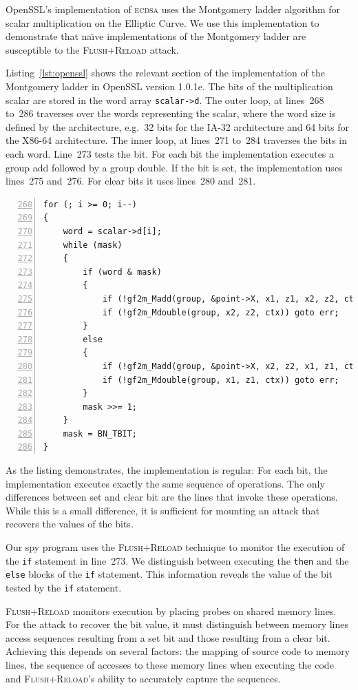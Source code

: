 \documentclass[twocolumn]{svjour3}
\begin{document}
OpenSSL's implementation of \textsc{ecdsa} uses the Montgomery ladder algorithm for scalar multiplication
on the Elliptic Curve.
We use this implementation to demonstrate that na{\"\i}ve implementations of the Montgomery ladder are
susceptible to the \textsc{Flush+Reload} attack.

Listing~\ref{lst:openssl} shows the relevant section of the implementation of the Montgomery ladder in OpenSSL version 1.0.1e.
The bits of the multiplication scalar are stored in the word array \texttt{scalar->d}.
The outer loop, at lines~268 to~286 traverses over the words representing the scalar,
where the word size is defined by the architecture, e.g.\ 32 bits for the IA-32 architecture and 64 bits for the X86-64 architecture.
The inner loop, at lines~271 to~284 traverses the bits in each word.
Line~273 tests the bit. 
For each bit the implementation executes a group add followed by a group double.
If the bit is set, the implementation uses lines~275 and~276.
For clear bits it uses lines~280 and~281.

\begin{lstlisting}[numbers=left,firstnumber=268,float=htb,caption=OpenSSL implementation of the Montgomery ladder,label=lst:openssl]
for (; i >= 0; i--)
{
    word = scalar->d[i];
    while (mask)
    {
        if (word & mask)
        {
            if (!gf2m_Madd(group, &point->X, x1, z1, x2, z2, ctx)) goto err;
            if (!gf2m_Mdouble(group, x2, z2, ctx)) goto err;
        }
        else
        {
            if (!gf2m_Madd(group, &point->X, x2, z2, x1, z1, ctx)) goto err;
            if (!gf2m_Mdouble(group, x1, z1, ctx)) goto err;
        }
        mask >>= 1;
    }
    mask = BN_TBIT;
}
\end{lstlisting}

As the listing demonstrates, the implementation is regular: For each bit, the implementation executes exactly the same sequence of operations.
The only differences between set and clear bit are the lines that invoke these operations.
While this is a small difference, it is sufficient for mounting an attack that recovers 
the values of the bits.


Our spy program uses the \textsc{Flush+Reload} technique to monitor the execution of the \texttt{if}
statement in line~273.
We distinguish between executing the \texttt{then} and the \texttt{else} blocks of the \texttt{if}
statement.
This information reveals the value of the bit tested by the \texttt{if} statement.

\textsc{Flush+Reload} monitors execution by placing probes on shared memory lines.
For the attack to recover the bit value, it must distinguish between memory lines access sequences
resulting from a set bit and those resulting from a clear bit.
Achieving this depends on several factors: the mapping of source code to memory lines, 
the sequence of accesses to these memory lines when executing the code and 
\textsc{Flush+Reload}'s ability to accurately capture the sequences.
\end{document}

